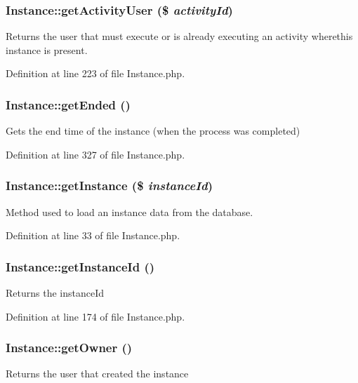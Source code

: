 \subsubsection{\setlength{\rightskip}{0pt plus 5cm}Instance::get\-Activity\-User (\$ {\em activity\-Id})}\label{classInstance_a14}


Returns the user that must execute or is already executing an activity wherethis instance is present. 

Definition at line 223 of file Instance.php.
\subsubsection{\setlength{\rightskip}{0pt plus 5cm}Instance::get\-Ended ()}\label{classInstance_a22}


Gets the end time of the instance (when the process was completed) 

Definition at line 327 of file Instance.php.
\subsubsection{\setlength{\rightskip}{0pt plus 5cm}Instance::get\-Instance (\$ {\em instance\-Id})}\label{classInstance_a1}


Method used to load an instance data from the database. 

Definition at line 33 of file Instance.php.
\subsubsection{\setlength{\rightskip}{0pt plus 5cm}Instance::get\-Instance\-Id ()}\label{classInstance_a9}


Returns the instance\-Id 

Definition at line 174 of file Instance.php.
\subsubsection{\setlength{\rightskip}{0pt plus 5cm}Instance::get\-Owner ()}\label{classInstance_a11}


Returns the user that created the instance 

